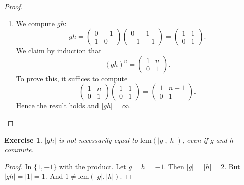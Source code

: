 \documentclass[a4paper, 11pt]{book}
\theoremstyle{plain}
\newtheorem{exercise}[theorem]{Exercise}
\theoremstyle{plain}
\begin{document}
\begin{proof}
\begin{enumerate}
$$\begin{array}{cc}
0 & 1\\ -1 & -1
\end{array}\right)\left(\begin{array}{cc}
-1 & -1\\ 1 & 0
\end{array}\right) = \left(\begin{array}{cc}
1 & 0\\ 0 & 1
\end{array}\right).$$
Hence $|h|=3$.
\item We compute $gh$:
$$gh = \left(\begin{array}{cc}
0 & -1\\ 1 & 0
\end{array}\right)\left(\begin{array}{cc}
0 & 1\\ -1 & -1
\end{array}\right) = \left(\begin{array}{cc}
1 & 1\\ 0 & 1
\end{array}\right).$$
We claim by induction that
$$(gh)^n = \left(\begin{array}{cc}
1 & n\\ 0 & 1
\end{array}\right).$$
To prove this, it suffices to compute
$$\left(\begin{array}{cc}
1 & n\\ 0 & 1
\end{array}\right)\left(\begin{array}{cc}
1 & 1\\ 0 & 1
\end{array}\right)=\left(\begin{array}{cc}
1 & n+1\\ 0 & 1
\end{array}\right).$$
Hence the result holds and $|gh|=\infty$.
\end{enumerate}
\end{proof}

\begin{exercise}
$|gh|$ is not necessarily equal to $\text{lcm}(|g|,|h|)$, even if $g$ and $h$ commute.
\end{exercise}
\begin{proof}
In $\{1,-1\}$ with the product. Let $g=h=-1$. Then $|g|=|h| = 2$. But $|gh| = |1| = 1$. And $1\neq \text{lcm}(|g|, |h|)$.
\end{proof}
\end{document}
